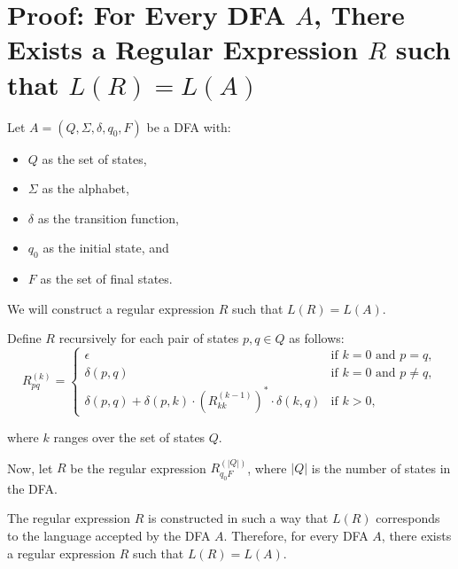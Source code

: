 \documentclass{article}
\begin{document}
\section*{Proof: For Every DFA \(A\), There Exists a Regular Expression \(R\) such that \(L(R) = L(A)\)}

Let \(A = (Q, \Sigma, \delta, q_0, F)\) be a DFA with:
\begin{itemize}
    \item \(Q\) as the set of states,
    \item \(\Sigma\) as the alphabet,
    \item \(\delta\) as the transition function,
    \item \(q_0\) as the initial state, and
    \item \(F\) as the set of final states.
\end{itemize}

We will construct a regular expression \(R\) such that \(L(R) = L(A)\).

Define \(R\) recursively for each pair of states \(p, q \in Q\) as follows:
\[
R_{pq}^{(k)} =
\begin{cases}
    \epsilon & \text{if } k = 0 \text{ and } p = q, \\
    \delta(p, q) & \text{if } k = 0 \text{ and } p \neq q, \\
    \delta(p, q) + \delta(p, k) \cdot (R_{kk}^{(k-1)})^* \cdot \delta(k, q) & \text{if } k > 0,
\end{cases}
\]

where \(k\) ranges over the set of states \(Q\).

Now, let \(R\) be the regular expression \(R_{q_0F}^{(|Q|)}\), where \(|Q|\) is the number of states in the DFA.

The regular expression \(R\) is constructed in such a way that \(L(R)\) corresponds to the language accepted by the DFA \(A\). Therefore, for every DFA \(A\), there exists a regular expression \(R\) such that \(L(R) = L(A)\).
\end{document}
